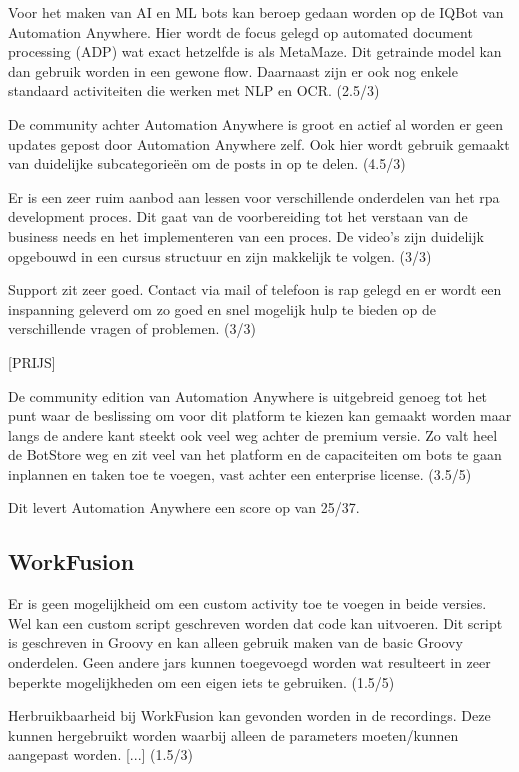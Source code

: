 Voor het maken van AI en ML bots kan beroep gedaan worden op de IQBot van Automation Anywhere. Hier wordt de focus gelegd op automated document processing (ADP) wat exact hetzelfde is als MetaMaze. Dit getrainde model kan dan gebruik worden in een gewone flow. Daarnaast zijn er ook nog enkele standaard activiteiten die werken met NLP en OCR. (2.5/3)

De community achter Automation Anywhere is groot en actief al worden er geen updates gepost door Automation Anywhere zelf. Ook hier wordt gebruik gemaakt van duidelijke subcategorieën om de posts in op te delen. (4.5/3) 

Er is een zeer ruim aanbod aan lessen voor verschillende onderdelen van het \acrshort{rpa} development proces. Dit gaat van de voorbereiding tot het verstaan van de business needs en het implementeren van een proces. De video's zijn duidelijk opgebouwd in een cursus structuur en zijn makkelijk te volgen. (3/3)

Support zit zeer goed. Contact via mail of telefoon is rap gelegd en er wordt een inspanning geleverd om zo goed en snel mogelijk hulp te bieden op de verschillende vragen of problemen. (3/3)

[PRIJS]

De community edition van Automation Anywhere is uitgebreid genoeg tot het punt waar de beslissing om voor dit platform te kiezen kan gemaakt worden maar langs de andere kant steekt ook veel weg achter de premium versie. Zo valt heel de BotStore weg en zit veel van het platform en de capaciteiten om bots te gaan inplannen en taken toe te voegen, vast achter een enterprise license. (3.5/5)

Dit levert Automation Anywhere een score op van 25/37.

\subsection{WorkFusion}

Er is geen mogelijkheid om een custom activity toe te voegen in beide versies. Wel kan een custom script geschreven worden dat code kan uitvoeren. Dit script is geschreven in Groovy en kan alleen gebruik maken van de basic Groovy onderdelen. Geen andere jars kunnen toegevoegd worden wat resulteert in zeer beperkte mogelijkheden om een eigen iets te gebruiken. (1.5/5)

Herbruikbaarheid bij WorkFusion kan gevonden worden in de recordings. Deze kunnen hergebruikt worden waarbij alleen de parameters moeten/kunnen aangepast worden. [...] (1.5/3)

